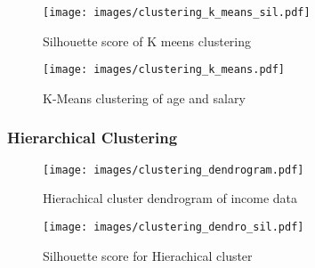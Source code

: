 \begin{figure}[H]
    \centering
    \texttt{[image: images/clustering\_k\_means\_sil.pdf]} %
    \caption{Silhouette score of K meens clustering}
    \label{fig:silhouette of k means clustering}
\end{figure}

\begin{figure}[H]
    \centering
    \texttt{[image: images/clustering\_k\_means.pdf]} %
    \caption{K-Means clustering of age and salary}
    \label{fig:kMeans clustering of age and salary}
\end{figure}

\subsubsection{Hierarchical Clustering}

\begin{figure}[H]
    \centering
    \texttt{[image: images/clustering\_dendrogram.pdf]} %
    \caption{Hierachical cluster dendrogram of income data}
    \label{fig:Hierachical cluster dendrogram of income data}
\end{figure}

\begin{figure}[H]
    \centering
    \texttt{[image: images/clustering\_dendro\_sil.pdf]} %
    \caption{Silhouette score for Hierachical cluster}
    \label{fig:Hierachical cluster silhouette score}
\end{figure}